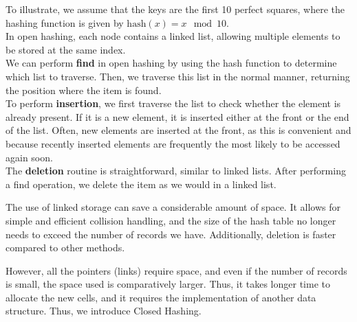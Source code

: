 \begin{minipage}{0.7\textwidth}
To illustrate, we assume that the keys are the first 10 perfect squares, where the hashing function is given by \(\text{hash}(x) = x \mod 10\).\\[5pt]
In open hashing, each node contains a linked list, allowing multiple elements to be stored at the same index.\\[5pt]
We can perform \textbf{find} in open hashing by using the hash function to determine which list to traverse. Then, we traverse this list in the normal manner, returning the position where the item is found.\\[5pt]
To perform \textbf{insertion}, we first traverse the list to check whether the element is already present. If it is a new element, it is inserted either at the front or the end of the list. Often, new elements are inserted at the front, as this is convenient and because recently inserted elements are frequently the most likely to be accessed again soon.\\[5pt]
The \textbf{deletion} routine is straightforward, similar to linked lists. After performing a find operation, we delete the item as we would in a linked list.
\end{minipage}
\begin{minipage}{0.3\textwidth}
\begin{center}
\end{center}
\end{minipage}

The use of linked storage can save a considerable amount of space. It allows for simple and efficient collision handling, and the size of the hash table no longer needs to exceed the number of records we have. Additionally, deletion is faster compared to other methods.

However, all the pointers (links) require space, and even if the number of records is small, the space used is comparatively larger. Thus, it takes longer time to allocate the new cells, and it requires the implementation of another data structure. Thus, we introduce Closed Hashing.

